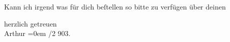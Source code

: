 \pstart
           {\pb}Kann ich irgend was
               für dich beſtellen so bitte zu verfügen über deinen\pend
           
\pstart
           herzlich getreuen{\\[\baselineskip]}\spacefill\mbox{Arthur}\pend
           \leftskip=0em{}
/2 903.\pend
           \endnumbering{}  \newcommand{\dateiname}{L01270}\newcommand{\titel}{Arthur Schnitzler an Hermann Bahr, 20. 2. 1903}\newcommand{\editorInnen}{Herausgegeben von Martin Anton Müller}
